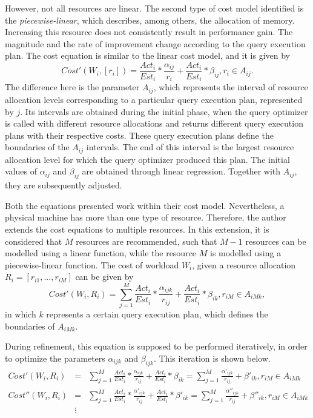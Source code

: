 \documentclass[jidm,a4paper]{jidm} %
\begin{document}
However, not all resources are linear. The second type of cost model identified is the \textit{piecewise-linear}, which describes, among others, the allocation of memory. Increasing this resource does not consistently result in performance gain. The magnitude and the rate of improvement change according to the query execution plan. The cost equation is similar to the linear cost model, and it is given by
\[
  Cost'(W_{i}, [r_{i}]) = \frac{Act_{i}}{Est_{i}} * \frac{\alpha_{ij}}{r_{i}} + \frac{Act_{i}}{Est_{i}} * \beta_{ij}, r_{i} \in A_{ij}.
\]
The difference here is the parameter $A_{ij}$, which represents the interval of resource allocation levels corresponding to a particular query execution plan, represented by $j$. Its intervals are obtained during the initial phase, when the query optimizer is called with different resource allocations and returns different query execution plans with their respective costs. These query execution plans define the boundaries of the $A_{ij}$ intervals. The end of this interval is the largest resource allocation level for which the query optimizer produced this plan. The initial values of $\alpha_{ij}$ and $\beta_{ij}$ are obtained through linear regression. Together with $A_{ij}$, they are subsequently adjusted.

Both the equations presented work within their cost model. Nevertheless, a physical  machine has more than one type of resource. Therefore, the author extends the cost equations to multiple resources. In this extension, it is considered that $M$ resources are recommended, such that $M-1$ resources can be modelled using a linear function, while the resource $M$ is modelled using a piecewise-linear function. The cost of workload $W_{i}$, given a resource allocation $R_{i} = [r_{i1},...,r_{iM}]$ can be given by
\[
  Cost'(W_{i}, R_{i}) = \sum_{j=1}^{M} \frac{Act_{i}}{Est_{i}} * \frac{\alpha_{ijk}}{r_{ij}} + \frac{Act_{i}}{Est_{i}} * \beta_{ik}, r_{iM} \in A_{iMk},
\]
in which $k$ represents a certain query execution plan, which defines the boundaries of $A_{iMk}$. 

During refinement, this equation is supposed to be performed iteratively, in order to optimize the parameters $\alpha_{ijk}$ and $\beta_{ijk}$. This iteration is shown below.
\begin{eqnarray*}
 Cost'(W_{i}, R_{i}) &=& \sum_{j=1}^{M} \frac{Act_{i}}{Est_{i}} * \frac{\alpha_{ijk}}{r_{ij}} + \frac{Act_{i}}{Est_{i}} * \beta_{ik} = \sum_{j=1}^{M} \frac{\alpha'_{ijk}}{r_{ij}} + \beta'_{ik}, r_{iM} \in A_{iMk} \\
 Cost''(W_{i}, R_{i}) &=& \sum_{j=1}^{M} \frac{Act_{i}}{Est_{i}} * \frac{\alpha'_{ijk}}{r_{ij}} + \frac{Act_{i}}{Est_{i}} * \beta'_{ik} = \sum_{j=1}^{M} \frac{\alpha''_{ijk}}{r_{ij}} + \beta''_{ik}, r_{iM} \in A_{iMk} \\
  &\vdots&
\end{eqnarray*}
\end{document}
